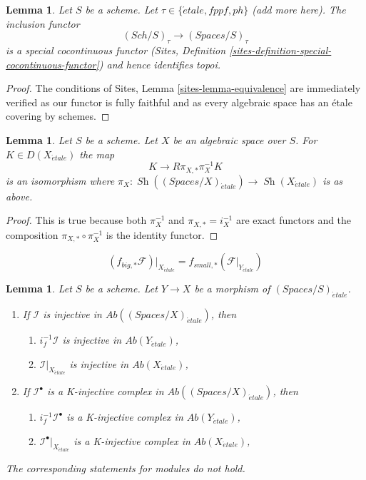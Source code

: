 \documentclass{stacks-project}
\theoremstyle{plain}
\newtheorem{lemma}[subsection]{Lemma}
\theoremstyle{definition}
\theoremstyle{remark}
\numberwithin{equation}{subsection}
\def\Sch{\mathit{Sch}}
\def\Sh{\mathop{\mathit{Sh}}\nolimits}
\def\etale{{\acute{e}tale}}
\begin{document}
\begin{lemma}
\label{lemma-compare-cohomology-other-topologies}
Let $S$ be a scheme. Let $\tau \in \{\etale, fppf, ph\}$ (add more here).
The inclusion functor
$$
(\Sch/S)_\tau \longrightarrow (\textit{Spaces}/S)_\tau
$$
is a special cocontinuous functor
(Sites, Definition \ref{sites-definition-special-cocontinuous-functor})
and hence identifies topoi.
\end{lemma}

\begin{proof}
The conditions of Sites, Lemma \ref{sites-lemma-equivalence}
are immediately verified as our functor is fully faithful
and as every algebraic space has an \'etale covering by schemes.
\end{proof}

\begin{lemma}
\label{lemma-cohomological-descent-etale}
Let $S$ be a scheme. Let $X$ be an algebraic space over $S$.
For $K \in D(X_\etale)$ the map
$$
K \longrightarrow R\pi_{X, *}\pi_X^{-1}K
$$
is an isomorphism where
$\pi_X : \Sh((\textit{Spaces}/X)_\etale) \to \Sh(X_\etale)$ is as above.
\end{lemma}

\begin{proof}
This is true because both $\pi_X^{-1}$ and $\pi_{X, *} = i_X^{-1}$
are exact functors and the composition $\pi_{X, *} \circ \pi_X^{-1}$
is the identity functor.
\end{proof}

\begin{equation}
\label{equation-compare-big-small}
(f_{big, *}\mathcal{F})|_{X_\etale} =
f_{small, *}(\mathcal{F}|_{Y_\etale})
\end{equation}

\begin{lemma}
\label{lemma-compare-injectives}
Let $S$ be a scheme.
Let $Y \to X$ be a morphism of $(\textit{Spaces}/S)_\etale$.
\begin{enumerate}
\item If $\mathcal{I}$ is injective in
$\textit{Ab}((\textit{Spaces}/X)_\etale)$, then
\begin{enumerate}
\item $i_f^{-1}\mathcal{I}$ is injective in $\textit{Ab}(Y_\etale)$,
\item $\mathcal{I}|_{X_\etale}$ is injective in $\textit{Ab}(X_\etale)$,
\end{enumerate}
\item If $\mathcal{I}^\bullet$ is a K-injective complex
in $\textit{Ab}((\textit{Spaces}/X)_\etale)$, then
\begin{enumerate}
\item $i_f^{-1}\mathcal{I}^\bullet$ is a K-injective complex in
$\textit{Ab}(Y_\etale)$,
\item $\mathcal{I}^\bullet|_{X_\etale}$ is a K-injective complex in
$\textit{Ab}(X_\etale)$,
\end{enumerate}
\end{enumerate}
The corresponding statements for modules do not hold.
\end{lemma}
\end{document}
